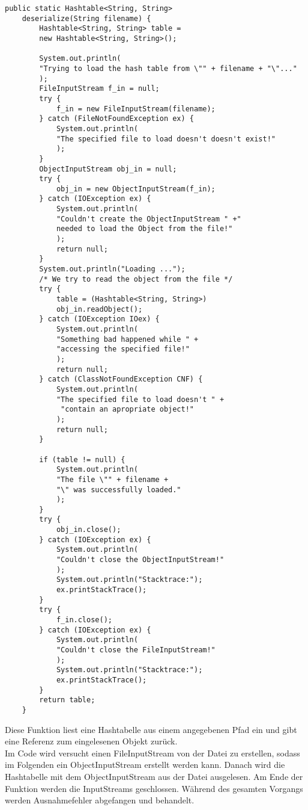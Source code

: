 \documentclass[11pt]{article}
\begin{document}
\begin{lstlisting}[caption=Algorithmus zur Deserialisierung einer Datei und Einlesen einer Hashtabelle, label=lst:deserializing]
    public static Hashtable<String, String> 
    deserialize(String filename) {
        Hashtable<String, String> table = 
        new Hashtable<String, String>();

        System.out.println(
        "Trying to load the hash table from \"" + filename + "\"..."
        );
        FileInputStream f_in = null;
        try {
            f_in = new FileInputStream(filename);
        } catch (FileNotFoundException ex) {
            System.out.println(
            "The specified file to load doesn't doesn't exist!"
            );
        }
        ObjectInputStream obj_in = null;
        try {
            obj_in = new ObjectInputStream(f_in);
        } catch (IOException ex) {
            System.out.println(
            "Couldn't create the ObjectInputStream " +"
            needed to load the Object from the file!"
            );
            return null;
        }
        System.out.println("Loading ...");
        /* We try to read the object from the file */
        try {
            table = (Hashtable<String, String>) 
            obj_in.readObject();
        } catch (IOException IOex) {
            System.out.println(
            "Something bad happened while " +
            "accessing the specified file!"
            );
            return null;
        } catch (ClassNotFoundException CNF) {
            System.out.println(
            "The specified file to load doesn't " +
             "contain an apropriate object!"
            );
            return null;
        }

        if (table != null) {
            System.out.println(
            "The file \"" + filename + 
            "\" was successfully loaded."
            );
        }
        try {
            obj_in.close();
        } catch (IOException ex) {
            System.out.println(
            "Couldn't close the ObjectInputStream!"
            );
            System.out.println("Stacktrace:");
            ex.printStackTrace();
        }
        try {
            f_in.close();
        } catch (IOException ex) {
            System.out.println(
            "Couldn't close the FileInputStream!"
            );
            System.out.println("Stacktrace:");
            ex.printStackTrace();
        }
        return table;
    }
\end{lstlisting}
Diese Funktion liest eine Hashtabelle aus einem angegebenen Pfad ein und gibt eine Referenz zum eingelesenen Objekt zurück.\\
Im Code wird versucht einen FileInputStream von der Datei zu erstellen, sodass im Folgenden ein ObjectInputStream erstellt werden kann. Danach wird die Hashtabelle mit dem ObjectInputStream aus der Datei ausgelesen. Am Ende der Funktion werden die InputStreams geschlossen. Während des gesamten Vorgangs werden Ausnahmefehler abgefangen und behandelt.
\end{document}
